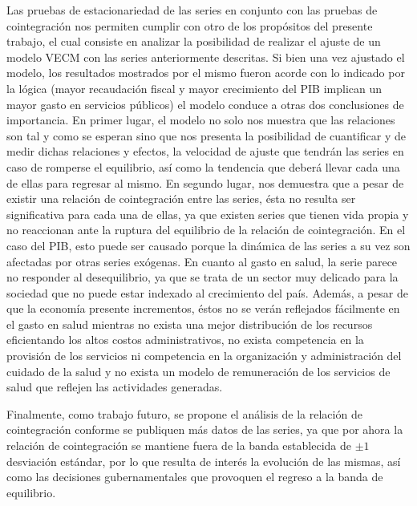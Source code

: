 Las pruebas de estacionariedad de las series en conjunto con las pruebas de cointegración nos permiten cumplir con otro de los propósitos del presente trabajo, el cual consiste en analizar la posibilidad de realizar el ajuste de un modelo VECM con las series anteriormente descritas. Si bien una vez ajustado el modelo, los resultados mostrados por el mismo fueron acorde con lo indicado por la lógica (mayor recaudación fiscal y mayor crecimiento del PIB implican un mayor gasto en servicios públicos) el modelo conduce a otras dos conclusiones de importancia. En primer lugar, el modelo no solo nos muestra que las relaciones son tal y como se esperan sino que nos presenta la posibilidad de cuantificar y de medir dichas relaciones y efectos, la velocidad de ajuste que tendrán las series en caso de romperse el equilibrio, así como la tendencia que deberá llevar cada una de ellas para regresar al mismo. En segundo lugar, nos demuestra que a pesar de existir una relación de cointegración entre las series, ésta no resulta ser significativa para cada una de ellas, ya que existen series que tienen vida propia y no reaccionan ante la ruptura del equilibrio de la relación de cointegración. En el caso del PIB, esto puede ser causado porque la dinámica de las series a su vez son afectadas por otras series exógenas. En cuanto al gasto en salud, la serie parece no responder al desequilibrio, ya que se trata de un sector muy delicado para la sociedad que no puede estar indexado al crecimiento del país. Además,  a pesar de que la economía presente incrementos, éstos no se verán reflejados fácilmente en el gasto en salud mientras no exista una mejor distribución de los recursos eficientando los altos costos administrativos, no exista competencia en la provisión de los servicios ni competencia en la organización y administración del cuidado de la salud y no exista un modelo de remuneración de los servicios de salud que reflejen las actividades generadas.\bigskip


Finalmente, como trabajo futuro, se propone el análisis de la relación de cointegración conforme se publiquen más datos de las series, ya que por ahora la relación de cointegración se mantiene fuera de la banda establecida de $\pm 1$ desviación estándar, por lo que resulta de interés la evolución de las mismas, así como las decisiones gubernamentales que provoquen el regreso a la banda de equilibrio.\bigskip
